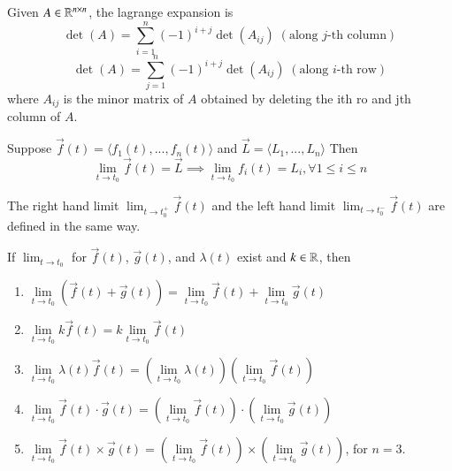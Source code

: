 \begin{appendices}
    \begin{rec}
        Given $A \in \mathbb R^{n\times n}$, the lagrange expansion is \begin{equation}
            \det(A) = \sum\limits_{i=1}^n(-1)^{i+j}\det(A_{ij})\;(\text{along $j$-th column})
        \end{equation}
        \begin{equation}
            \det(A) = \sum\limits_{j=1}^n(-1)^{i+j}\det(A_{ij})\;(\text{along $i$-th row})
        \end{equation}
        where $A_{ij}$ is the minor matrix of $A$ obtained by deleting the ith ro and jth column of $A$.
    \end{rec}

    \begin{defn}
        Suppose $\vec{f}(t) = \langle f_1(t),...,f_n(t)\rangle$ and $\vec{L} = \langle L_1,...,L_n\rangle$ Then \begin{equation}
            \lim\limits_{t\rightarrow t_0}\vec{f}(t) = \vec{L} \implies \lim\limits_{t\rightarrow t_0}f_i(t) = L_i, \forall 1\leq i \leq n
        \end{equation}
    \end{defn}

    \begin{rmk}
        The right hand limit $\lim_{t\rightarrow t_0^+}\vec{f}(t)$ and the left hand limit $\lim_{t\rightarrow t_0^-}\vec{f}(t)$ are defined in the same way.
    \end{rmk}

    \begin{rmk}
        If $\lim_{t\rightarrow t_0}$ for $\vec{f}(t)$, $\vec{g}(t)$, and $\lambda(t)$ exist and $k \in \mathbb R$, then \begin{enumerate}
            \item $\lim\limits_{t\rightarrow t_0}(\vec{f}(t)+\vec{g}(t)) = \lim\limits_{t\rightarrow t_0}\vec{f}(t) + \lim\limits_{t\rightarrow t_0}\vec{g}(t)$
            \item $\lim\limits_{t\rightarrow t_0}k\vec{f}(t) = k\lim\limits_{t\rightarrow t_0}\vec{f}(t)$
            \item $\lim\limits_{t\rightarrow t_0}\lambda(t)\vec{f}(t) = (\lim\limits_{t\rightarrow t_0}\lambda(t))(\lim\limits_{t\rightarrow t_0}\vec{f}(t))$
            \item $\lim\limits_{t\rightarrow t_0}\vec{f}(t)\cdot \vec{g}(t) = (\lim\limits_{t\rightarrow t_0}\vec{f}(t))\cdot(\lim\limits_{t\rightarrow t_0}\vec{g}(t))$
            \item $\lim\limits_{t\rightarrow t_0}\vec{f}(t)\times \vec{g}(t) = (\lim\limits_{t\rightarrow t_0}\vec{f}(t))\times(\lim\limits_{t\rightarrow t_0}\vec{g}(t))$, for $n = 3$.
        \end{enumerate}
    \end{rmk}



\end{appendices}
